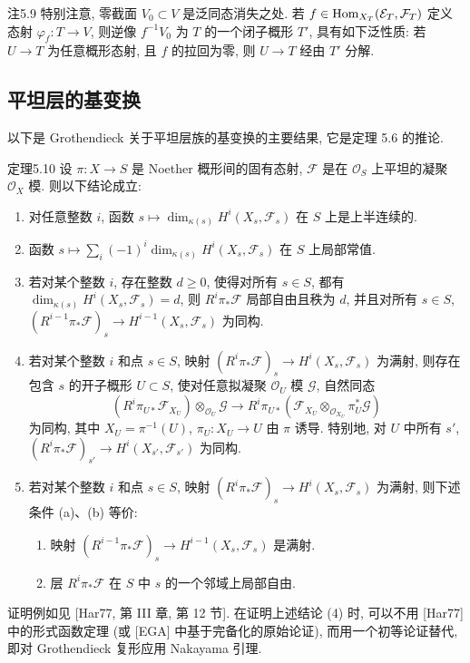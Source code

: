 \begin{origstatement}{注}{5.9}\label{ch05:rem5.9}
特别注意, 零截面 $V_0\subset V$ 是泛同态消失之处. 若 $f\in\operatorname{Hom}_{X_T}(\mathcal E_T,\mathcal F_T)$ 定义态射 $\varphi_f:T\to V$, 则逆像 $f^{-1}V_0$ 为 $T$ 的一个闭子概形 $T'$, 具有如下泛性质: 若 $U\to T$ 为任意概形态射, 且 $f$ 的拉回为零, 则 $U\to T$ 经由 $T'$ 分解.
\end{origstatement}

\subsection{平坦层的基变换}\label{ch05:sec5.3.4}
以下是 Grothendieck 关于平坦层族的基变换的主要结果, 它是定理 5.6 的推论.
\begin{origstatement}{定理}{5.10}\label{ch05:thm5.10}
设 $\pi:X\to S$ 是 Noether 概形间的固有态射, $\mathcal F$ 是在 $\mathcal O_S$ 上平坦的凝聚 $\mathcal O_X$ 模. 则以下结论成立:
\begin{enumerate}
\item[(1)] 对任意整数 $i$, 函数 $s\mapsto\dim_{\kappa(s)}H^i(X_s,\mathcal F_s)$ 在 $S$ 上是上半连续的.
\item[(2)] 函数 $s\mapsto\sum_i(-1)^i\dim_{\kappa(s)}H^i(X_s,\mathcal F_s)$ 在 $S$ 上局部常值.
\item[(3)] 若对某个整数 $i$, 存在整数 $d\geq0$, 使得对所有 $s\in S$, 都有 $\dim_{\kappa(s)}H^i(X_s,\mathcal F_s)=d$, 则 $R^i\pi_*\mathcal F$ 局部自由且秩为 $d$, 并且对所有 $s\in S$, $(R^{i-1}\pi_*\mathcal F)_s\to H^{i-1}(X_s,\mathcal F_s)$ 为同构.
\item[(4)] 若对某个整数 $i$ 和点 $s\in S$, 映射 $(R^i\pi_*\mathcal F)_s\to H^i(X_s,\mathcal F_s)$ 为满射, 则存在包含 $s$ 的开子概形 $U\subset S$, 使对任意拟凝聚 $\mathcal O_U$ 模 $\mathcal G$, 自然同态
\[
 (R^i\pi_{U*}\mathcal F_{X_U})\otimes_{\mathcal O_U}\mathcal G
 \longrightarrow R^i\pi_{U*}(\mathcal F_{X_U}\otimes_{\mathcal O_{X_U}}\pi_U^*\mathcal G)
\]
为同构, 其中 $X_U=\pi^{-1}(U)$, $\pi_U:X_U\to U$ 由 $\pi$ 诱导. 特别地, 对 $U$ 中所有 $s'$, $(R^i\pi_*\mathcal F)_{s'}\to H^i(X_{s'},\mathcal F_{s'})$ 为同构.
\item[(5)] 若对某个整数 $i$ 和点 $s\in S$, 映射 $(R^i\pi_*\mathcal F)_s\to H^i(X_s,\mathcal F_s)$ 为满射, 则下述条件 (a)、(b) 等价:
\begin{enumerate}
\item[(a)] 映射 $(R^{i-1}\pi_*\mathcal F)_s\to H^{i-1}(X_s,\mathcal F_s)$ 是满射.
\item[(b)] 层 $R^i\pi_*\mathcal F$ 在 $S$ 中 $s$ 的一个邻域上局部自由.
\end{enumerate}
\end{enumerate}
\end{origstatement}
证明例如见 [Har77, 第 III 章, 第 12 节]. 在证明上述结论 (4) 时, 可以不用 [Har77] 中的形式函数定理 (或 [EGA] 中基于完备化的原始论证), 而用一个初等论证替代, 即对 Grothendieck 复形应用 Nakayama 引理.
